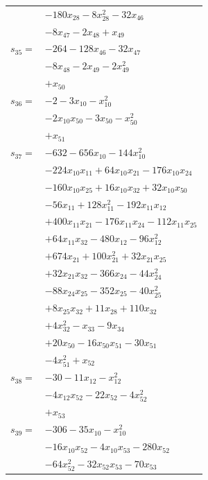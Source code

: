 \begin{longtable}{@{}r@{\;}l@{}}
 & \(\displaystyle -180x_{28} -8x_{28}^{2} -32x_{46}\) \\
 & \(\displaystyle -8x_{47} -2x_{48} +x_{49}\) \\[3pt]
\(s_{35}=\) & \(\displaystyle -264 -128x_{46} -32x_{47}\) \\
 & \(\displaystyle -8x_{48} -2x_{49} -2x_{49}^{2}\) \\
 & \(\displaystyle +x_{50}\) \\[3pt]
\(s_{36}=\) & \(\displaystyle -2 -3x_{10} -x_{10}^{2}\) \\
 & \(\displaystyle -2x_{10}x_{50} -3x_{50} -x_{50}^{2}\) \\
 & \(\displaystyle +x_{51}\) \\[3pt]
\(s_{37}=\) & \(\displaystyle -632 -656x_{10} -144x_{10}^{2}\) \\
 & \(\displaystyle -224x_{10}x_{11} +64x_{10}x_{21} -176x_{10}x_{24}\) \\
 & \(\displaystyle -160x_{10}x_{25} +16x_{10}x_{32} +32x_{10}x_{50}\) \\
 & \(\displaystyle -56x_{11} +128x_{11}^{2} -192x_{11}x_{12}\) \\
 & \(\displaystyle +400x_{11}x_{21} -176x_{11}x_{24} -112x_{11}x_{25}\) \\
 & \(\displaystyle +64x_{11}x_{32} -480x_{12} -96x_{12}^{2}\) \\
 & \(\displaystyle +674x_{21} +100x_{21}^{2} +32x_{21}x_{25}\) \\
 & \(\displaystyle +32x_{21}x_{32} -366x_{24} -44x_{24}^{2}\) \\
 & \(\displaystyle -88x_{24}x_{25} -352x_{25} -40x_{25}^{2}\) \\
 & \(\displaystyle +8x_{25}x_{32} +11x_{28} +110x_{32}\) \\
 & \(\displaystyle +4x_{32}^{2} -x_{33} -9x_{34}\) \\
 & \(\displaystyle +20x_{50} -16x_{50}x_{51} -30x_{51}\) \\
 & \(\displaystyle -4x_{51}^{2} +x_{52}\) \\[3pt]
\(s_{38}=\) & \(\displaystyle -30 -11x_{12} -x_{12}^{2}\) \\
 & \(\displaystyle -4x_{12}x_{52} -22x_{52} -4x_{52}^{2}\) \\
 & \(\displaystyle +x_{53}\) \\[3pt]
\(s_{39}=\) & \(\displaystyle -306 -35x_{10} -x_{10}^{2}\) \\
 & \(\displaystyle -16x_{10}x_{52} -4x_{10}x_{53} -280x_{52}\) \\
 & \(\displaystyle -64x_{52}^{2} -32x_{52}x_{53} -70x_{53}\) \\

\end{longtable}
